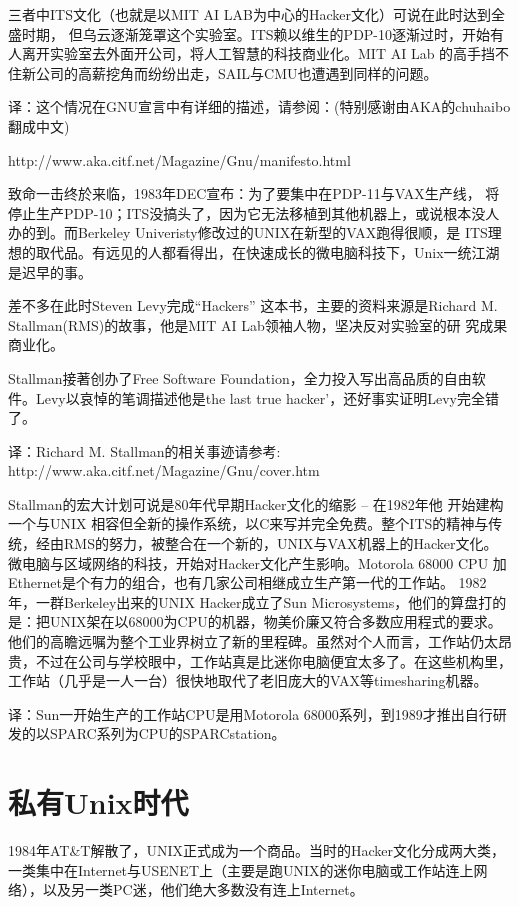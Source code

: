 \documentclass[a4paper,12pt,UTF8,twoside]{ctexbook}
\begin{document}
三者中ITS文化（也就是以MIT AI LAB为中心的Hacker文化）可说在此时达到全盛时期， 但乌云逐渐笼罩这个实验室。ITS赖以维生的PDP-10逐渐过时，开始有人离开实验室去外面开公司，将人工智慧的科技商业化。MIT AI Lab 的高手挡不住新公司的高薪挖角而纷纷出走，SAIL与CMU也遭遇到同样的问题。

译：这个情况在GNU宣言中有详细的描述，请参阅：(特别感谢由AKA的chuhaibo翻成中文)

http://www.aka.citf.net/Magazine/Gnu/manifesto.html

致命一击终於来临，1983年DEC宣布：为了要集中在PDP-11与VAX生产线， 将停止生产PDP-10；ITS没搞头了，因为它无法移植到其他机器上，或说根本没人办的到。而Berkeley Univeristy修改过的UNIX在新型的VAX跑得很顺，是 ITS理想的取代品。有远见的人都看得出，在快速成长的微电脑科技下，Unix一统江湖是迟早的事。

差不多在此时Steven Levy完成``Hackers'' 这本书，主要的资料来源是Richard M. Stallman(RMS)的故事，他是MIT AI Lab领袖人物，坚决反对实验室的研 究成果商业化。

Stallman接著创办了Free Software Foundation，全力投入写出高品质的自由软件。Levy以哀悼的笔调描述他是the last true hacker'，还好事实证明Levy完全错了。

译：Richard M. Stallman的相关事迹请参考: http://www.aka.citf.net/Magazine/Gnu/cover.htm

Stallman的宏大计划可说是80年代早期Hacker文化的缩影 -- 在1982年他 开始建构一个与UNIX 相容但全新的操作系统，以C来写并完全免费。整个ITS的精神与传统，经由RMS的努力，被整合在一个新的，UNIX与VAX机器上的Hacker文化。 微电脑与区域网络的科技，开始对Hacker文化产生影响。Motorola 68000 CPU 加Ethernet是个有力的组合，也有几家公司相继成立生产第一代的工作站。 1982年，一群Berkeley出来的UNIX Hacker成立了Sun Microsystems，他们的算盘打的是：把UNIX架在以68000为CPU的机器，物美价廉又符合多数应用程式的要求。他们的高瞻远嘱为整个工业界树立了新的里程碑。虽然对个人而言，工作站仍太昂贵，不过在公司与学校眼中，工作站真是比迷你电脑便宜太多了。在这些机构里，工作站（几乎是一人一台）很快地取代了老旧庞大的VAX等timesharing机器。

译：Sun一开始生产的工作站CPU是用Motorola 68000系列，到1989才推出自行研发的以SPARC系列为CPU的SPARCstation。

\chapter{私有Unix时代}

1984年AT\&T解散了，UNIX正式成为一个商品。当时的Hacker文化分成两大类，一类集中在Internet与USENET上（主要是跑UNIX的迷你电脑或工作站连上网络），以及另一类PC迷，他们绝大多数没有连上Internet。
\end{document}
